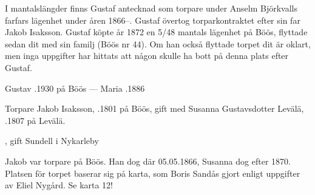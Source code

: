 I mantalslängder finns Gustaf antecknad som torpare under Anselm Björkvalls farfars lägenhet under åren 1866--. Gustaf övertog torparkontraktet efter sin far Jakob Isaksson. Gustaf köpte år 1872 en 5/48 mantals lägenhet på Böös, flyttade sedan dit med sin familj (Böös nr 44). Om han också flyttade torpet dit är oklart, men inga uppgifter har hittats att någon skulle ha bott på denna plats efter Gustaf.

Gustav .1930 på Böös  ---  Maria .1886


%
Torpare Jakob Isaksson, .1801 på Böös, gift med Susanna Gustavsdotter Levälä, .1807 på Levälä.
\begin{jhchildren}
  \item {}, gift Sundell i Nykarleby
  \item {}
  \item {}
  \item {}
\end{jhchildren}
Jakob var torpare på Böös. Han dog där 05.05.1866, Susanna dog efter 1870. Platsen för torpet baserar sig på karta, som Boris Sandås gjort enligt uppgifter av Eliel Nygård. Se karta 12!
